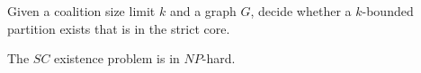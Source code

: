 \documentclass[sigconf]{aamas}
\begin{document}
\begin{definition}
Given a coalition size limit $k$ and a graph $G$, decide whether a $k$-bounded partition exists that is in the strict core.
\end{definition}
\begin{theorem}
The $SC$ existence problem is in $NP$-hard.
\end{theorem}


\end{document}
